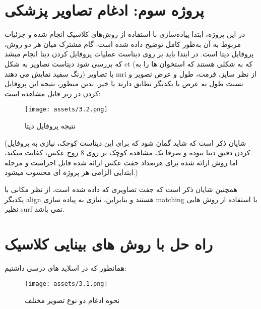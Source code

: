 \documentclass[a4paper,12pt]{article}
\begin{document}
\pagebreak


\section{پروژه سوم: ادغام تصاویر پزشکی}
در این پروژه، ابتدا پیاده‌سازی با استفاده از روش‌های کلاسیک انجام شده و جزئیات مربوط به آن به‌طور کامل توضیح داده شده است. گام مشترک میان هر دو روش، پروفایل دیتا است.
در ابتدا باید بر روی دیتاست عملیات پروفایل کردن دیتا انجام میشد که بررسی شود دیتاست تصاویر به شکل ct (که به شکلی هستند که استخوان ها را به رنگ سفید نمایش می دهند) با تصاویر mri از نظر سایز، فرمت، طول و عرض تصویر و نسبت طول به عرض با یکدیگر تطابق دارند یا خیر. بدین منظور، نتیجه این پروفایل کردن در زیر قابل مشاهده است:

\begin{figure}[h]
	\centering
	\texttt{[image: assets/3.2.png]}
	\caption{\textcolor{CustomAccent}{نتیجه پروفایل دیتا}}
\end{figure}
(شایان ذکر است که شاید گمان شود که برای این دیتاست کوچک، نیازی به پروفایل کردن دقیق دیتا نبوده و صرفا یک مشاهده کوچک بر روی 8 زوج عکس، کفایت میکند، اما روش ارائه شده برای هرتعداد جفت عکس ارائه شده قابل اجراست و مرحله ابتدایی الزامی هر پروژه ای محسوب میشود.)

همچنین شایان ذکر است که جفت تصاویری که داده شده است، از نظر مکانی با یکدیگر align هستند و بنابراین، نیازی به پیاده سازی matching با استفاده از روش هایی نظیر surf نمی باشد.

\section*{راه حل با روش های بینایی کلاسیک}

همانطور که در اسلاید های درسی داشتیم:
\begin{figure}[h]
	\centering
	\texttt{[image: assets/3.1.png]}
	\caption{\textcolor{CustomAccent}{نحوه ادغام دو نوع تصویر مختلف}}
\end{figure}
\end{document}
